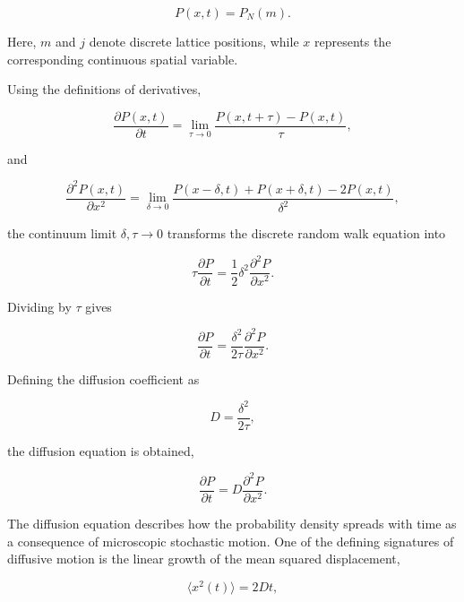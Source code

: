 \begin{equation}
P(x,t)=P_N(m).
\end{equation}

Here, $m$ and $j$ denote discrete lattice positions, while $x$ represents the corresponding continuous spatial variable.

Using the definitions of derivatives,

\begin{equation}
\frac{\partial P(x,t)}{\partial t}
=
\lim_{\tau\to0}
\frac{
P(x,t+\tau)-P(x,t)
}{\tau},
\end{equation}

and

\begin{equation}
\frac{\partial^2 P(x,t)}{\partial x^2}
=
\lim_{\delta\to0}
\frac{
P(x-\delta,t)+P(x+\delta,t)-2P(x,t)
}{\delta^2},
\end{equation}

the continuum limit $\delta,\tau \to 0$ transforms the discrete random walk equation into

\begin{equation}
\tau
\frac{\partial P}{\partial t}
=
\frac{1}{2}
\delta^2
\frac{\partial^2 P}{\partial x^2}.
\end{equation}

Dividing by $\tau$ gives

\begin{equation}
\frac{\partial P}{\partial t}
=
\frac{\delta^2}{2\tau}
\frac{\partial^2 P}{\partial x^2}.
\end{equation}

Defining the diffusion coefficient as

\begin{equation}
D=\frac{\delta^2}{2\tau},
\end{equation}

the diffusion equation is obtained,

\begin{equation}
\frac{\partial P}{\partial t}
=
D
\frac{\partial^2 P}{\partial x^2}.
\end{equation}

The diffusion equation describes how the probability density spreads with time as a consequence of microscopic stochastic motion. One of the defining signatures of diffusive motion is the linear growth of the mean squared displacement\cite{klafter2011},

\begin{equation}
\langle x^2(t)\rangle = 2Dt,
\end{equation}

